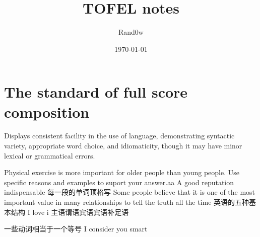 \documentclass[UTF8]{ctexart}
\title{TOFEL notes}
\author{Rand0w}
\date{\today}
\begin{document}
\maketitle
\tableofcontents
\section{The standard of full score composition}
 Displays consistent facility in the use of language, demonstrating syntactic variety, appropriate word choice, and idiomaticity, though it may have  minor lexical or grammatical errors.
 
 Physical exercise is more important for older people than young people. Use specific reasons and examples to suport your answer.aa
 A good reputation indispensable 
 每一段的单词顶格写 Some people believe that it is one of the most important value in many relationships to tell the truth all the time 
 英语的五种基本结构 I love i 
 主语谓语宾语宾语补足语
 

 一些动词相当于一个等号
 I consider you smart 
 
\end{document}
